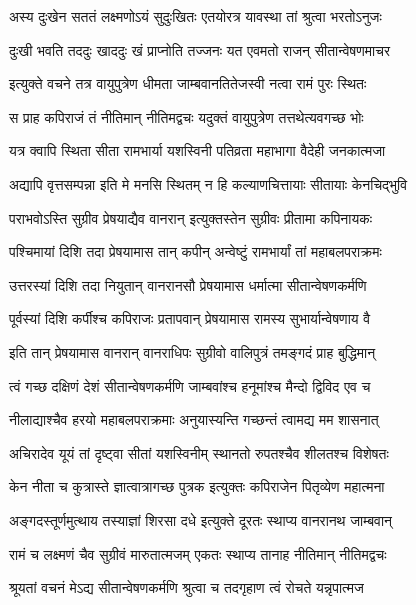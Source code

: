 \twolineshloka
{अस्य दुःखेन सततं लक्ष्मणोऽयं सुदुःखितः}
{एतयोरत्र यावस्था तां श्रुत्वा भरतोऽनुजः} %

\twolineshloka
{दुःखी भवति तददुः खाददुः खं प्राप्नोति तज्जनः}
{यत एवमतो राजन् सीतान्वेषणमाचर} %

\twolineshloka
{इत्युक्ते वचने तत्र वायुपुत्रेण धीमता}
{जाम्बवानतितेजस्वी नत्वा रामं पुरः स्थितः} %

\twolineshloka
{स प्राह कपिराजं तं नीतिमान् नीतिमद्वचः}
{यदुक्तं वायुपुत्रेण तत्तथेत्यवगच्छ भोः} %

\twolineshloka
{यत्र क्वापि स्थिता सीता रामभार्या यशस्विनी}
{पतिव्रता महाभागा वैदेही जनकात्मजा} %

\twolineshloka
{अद्यापि वृत्तसम्पन्ना इति मे मनसि स्थितम्}
{न हि कल्याणचित्तायाः सीतायाः केनचिद्भुवि} %

\twolineshloka
{पराभवोऽस्ति सुग्रीव प्रेषयाद्यैव वानरान्}
{इत्युक्तस्तेन सुग्रीवः प्रीतामा कपिनायकः} %

\twolineshloka
{पश्चिमायां दिशि तदा प्रेषयामास तान् कपीन्}
{अन्वेष्टुं रामभार्यां तां महाबलपराक्रमः} %

\twolineshloka
{उत्तरस्यां दिशि तदा नियुतान् वानरानसौ}
{प्रेषयामास धर्मात्मा सीतान्वेषणकर्मणि} %

\twolineshloka
{पूर्वस्यां दिशि कर्पीश्च कपिराजः प्रतापवान्}
{प्रेषयामास रामस्य सुभार्यान्वेषणाय वै} %

\twolineshloka
{इति तान् प्रेषयामास वानरान् वानराधिपः}
{सुग्रीवो वालिपुत्रं तमङ्गदं प्राह बुद्धिमान्} %

\twolineshloka
{त्वं गच्छ दक्षिणं देशं सीतान्वेषणकर्मणि}
{जाम्बवांश्च हनूमांश्च मैन्दो द्विविद एव च} %

\twolineshloka
{नीलाद्याश्चैव हरयो महाबलपराक्रमाः}
{अनुयास्यन्ति गच्छन्तं त्वामद्य मम शासनात्} %

\twolineshloka
{अचिरादेव यूयं तां दृष्ट्वा सीतां यशस्विनीम्}
{स्थानतो रुपतश्चैव शीलतश्च विशेषतः} %

\twolineshloka
{केन नीता च कुत्रास्ते ज्ञात्वात्रागच्छ पुत्रक}
{इत्युक्तः कपिराजेन पितृव्येण महात्मना} %

\twolineshloka
{अङ्गदस्तूर्णमुत्थाय तस्याज्ञां शिरसा दधे}
{इत्युक्ते दूरतः स्थाप्य वानरानथ जाम्बवान्} %

\twolineshloka
{रामं च लक्ष्मणं चैव सुग्रीवं मारुतात्मजम्}
{एकतः स्थाप्य तानाह नीतिमान् नीतिमद्वचः} %

\twolineshloka
{श्रूयतां वचनं मेऽद्य सीतान्वेषणकर्मणि}
{श्रुत्वा च तदगृहाण त्वं रोचते यन्नृपात्मज} %

